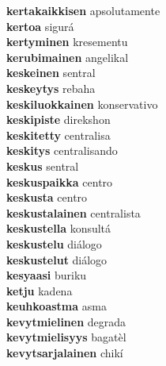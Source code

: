 \textbf{kertakaikkisen } apsolutamente \\
\textbf{kertoa } sigurá \\
\textbf{kertyminen } kresementu \\
\textbf{kerubimainen } angelikal \\
\textbf{keskeinen } sentral \\
\textbf{keskeytys } rebaha \\
\textbf{keskiluokkainen } konservativo \\
\textbf{keskipiste } direkshon \\
\textbf{keskitetty } centralisa \\
\textbf{keskitys } centralisando \\
\textbf{keskus } sentral \\
\textbf{keskuspaikka } centro \\
\textbf{keskusta } centro \\
\textbf{keskustalainen } centralista \\
\textbf{keskustella } konsultá \\
\textbf{keskustelu } diálogo \\
\textbf{keskustelut } diálogo \\
\textbf{kesyaasi } buriku \\
\textbf{ketju } kadena \\
\textbf{keuhkoastma } asma \\
\textbf{kevytmielinen } degrada \\
\textbf{kevytmielisyys } bagatèl \\
\textbf{kevytsarjalainen } chikí \\
